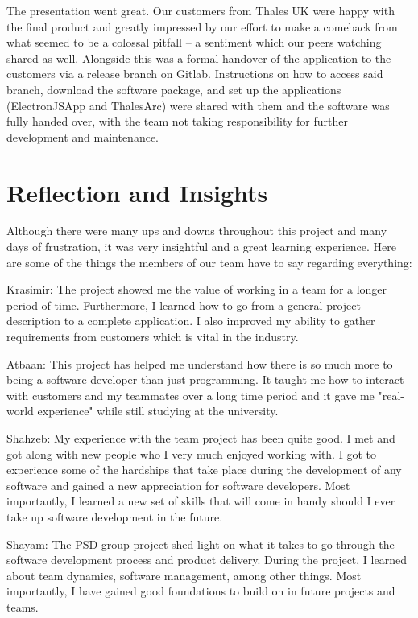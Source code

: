 \documentclass{l3proj}
\begin{document}
The presentation went great. Our customers from Thales UK were happy with the final product and greatly impressed by our effort to make a comeback from what seemed to be a colossal pitfall – a sentiment which our peers watching shared as well. Alongside this was a formal handover of the application to the customers via a release branch on Gitlab. Instructions on how to access said branch, download the software package, and set up the applications (ElectronJSApp and ThalesArc) were shared with them and the software was fully handed over, with the team not taking responsibility for further development and maintenance.

\section{Reflection and Insights}

Although there were many ups and downs throughout this project and many days of frustration, it was very insightful and a great learning experience. Here are some of the things the members of our team have to say regarding everything:

Krasimir: The project showed me the value of working in a team for a longer period of time. Furthermore, I learned how to go from a general project description to a complete application. I also improved my ability to gather requirements from customers which is vital in the industry.

Atbaan: This project has helped me understand how there is so much more to being a software developer than just programming. It taught me how to interact with customers and my teammates over a long time period and it gave me "real-world experience" while still studying at the university.

Shahzeb: My experience with the team project has been quite good. I met and got along with new people who I very much enjoyed working with. I got to experience some of the hardships that take place during the development of any software and gained a new appreciation for software developers. Most importantly, I learned a new set of skills that will come in handy should I ever take up software development in the future.

Shayam: The PSD group project shed light on what it takes to go through the software development process and product delivery. During the project, I learned about team dynamics, software management, among other things. Most importantly, I have gained good foundations to build on in future projects and teams.
\end{document}
